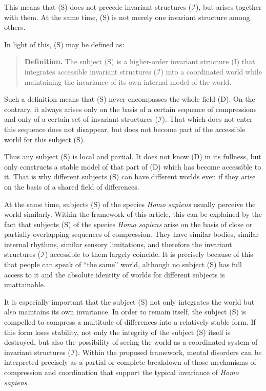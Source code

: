 \documentclass[aps,prd,onecolumn,nofootinbib,superscriptaddress]{revtex4-2}
\begin{document}
This means that (S) does not precede invariant structures ($\mathcal{I}$), but arises together with them. At the same time, (S) is not merely one invariant structure among others.

In light of this, (S) may be defined as:
\begin{quote}
\textbf{Definition.}
The subject (S) is a higher-order invariant structure (I) that integrates accessible invariant structures ($\mathcal{I}$) into a coordinated world while maintaining the invariance of its own internal model of the world.
\end{quote}

Such a definition means that (S) never encompasses the whole field (D). On the contrary, it always arises only on the basis of a certain sequence of compressions and only of a certain set of invariant structures ($\mathcal{I}$). That which does not enter this sequence does not disappear, but does not become part of the accessible world for this subject (S).

Thus any subject (S) is local and partial. It does not know (D) in its fullness, but only constructs a stable model of that part of (D) which has become accessible to it. That is why different subjects (S) can have different worlds even if they arise on the basis of a shared field of differences.

At the same time, subjects (S) of the species \emph{Homo sapiens} usually perceive the world similarly. Within the framework of this article, this can be explained by the fact that subjects (S) of the species \emph{Homo sapiens} arise on the basis of close or partially overlapping sequences of compression. They have similar bodies, similar internal rhythms, similar sensory limitations, and therefore the invariant structures ($\mathcal{I}$) accessible to them largely coincide. It is precisely because of this that people can speak of “the same” world, although no subject (S) has full access to it and the absolute identity of worlds for different subjects is unattainable.

It is especially important that the subject (S) not only integrates the world but also maintains its own invariance. In order to remain itself, the subject (S) is compelled to compress a multitude of differences into a relatively stable form. If this form loses stability, not only the integrity of the subject (S) itself is destroyed, but also the possibility of seeing the world as a coordinated system of invariant structures ($\mathcal{I}$). Within the proposed framework, mental disorders can be interpreted precisely as a partial or complete breakdown of those mechanisms of compression and coordination that support the typical invariance of \emph{Homo sapiens}.
\end{document}
